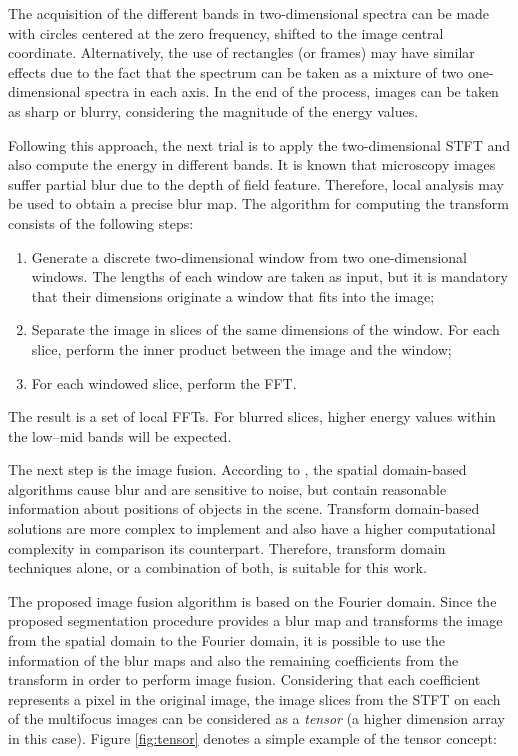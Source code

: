 The acquisition of the different bands in two-dimensional spectra can be made with circles centered at the zero frequency, shifted to the image central coordinate. Alternatively, the use of rectangles (or frames) may have similar effects due to the fact that the spectrum can be taken as a mixture of two one-dimensional spectra in each axis. In the end of the process,  images can be taken as sharp or blurry, considering the magnitude of the energy values.

Following this approach, the next trial is to apply the two-dimensional STFT and also compute the energy in different bands. It is known that microscopy images suffer partial blur due to the depth of field feature. Therefore, local analysis may be used to obtain a precise blur map. The algorithm for computing the transform consists of the following steps:

\begin{enumerate}[label=\Roman*.]
    \item Generate a discrete two-dimensional window from two one-dimensional windows. The lengths of each window are taken as input, but it is mandatory that their dimensions originate a window that fits into the image;
    
    \item Separate the image in slices of the same dimensions of the window. For each slice, perform the inner product between the image and the window;
    
    \item For each windowed slice, perform the FFT.
\end{enumerate}

The result is a set of local FFTs. For blurred slices, higher energy values within the low--mid bands will be expected. 

The next step is the image fusion. According to , the spatial domain-based algorithms cause blur and are sensitive to noise, but contain reasonable information about positions of objects in the scene. Transform domain-based solutions are more complex to implement and also have a higher computational complexity in comparison its counterpart. Therefore, transform domain techniques alone, or a combination of both,  is suitable for this work.

The proposed image fusion algorithm is based on the Fourier domain. Since the proposed segmentation procedure provides a blur map and transforms the image from the spatial domain to the Fourier domain, it is possible to use the information of the blur maps and also the remaining coefficients from the transform in order to perform image fusion. Considering that each coefficient represents a pixel in the original image, the image slices from the STFT on each of the multifocus images can be considered as a \emph{tensor} (a higher dimension array in this case). Figure \ref{fig:tensor} denotes a simple example of the tensor concept:

